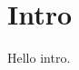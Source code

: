 \documentclass{article}
\begin{document}
\section{Intro}
Hello intro.
\vspace{520pt}

\end{document}
